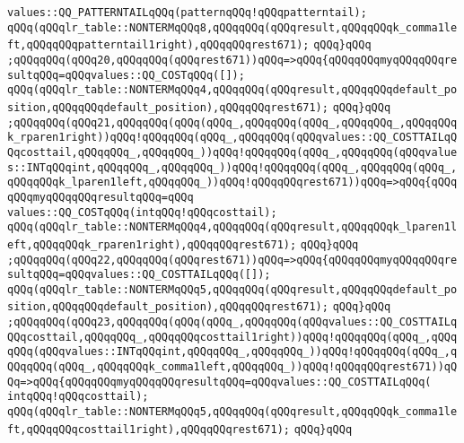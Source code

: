 \verb|values::QQ_PATTERNTAILqQQq(patternqQQq!qQQqpatterntail);|\newline
\verb|qQQq(qQQqlr_table::NONTERMqQQq8,qQQqqQQq(qQQqresult,qQQqqQQqk_comma1left,qQQqqQQqpatterntail1right),qQQqqQQqrest671);|\newline
\verb|qQQq}qQQq|\newline
\verb|;qQQqqQQq(qQQq20,qQQqqQQq(qQQqrest671))qQQq=>qQQq{qQQqqQQqmyqQQqqQQqresultqQQq=qQQqvalues::QQ_COSTqQQq([]);|\newline
\verb|qQQq(qQQqlr_table::NONTERMqQQq4,qQQqqQQq(qQQqresult,qQQqqQQqdefault_position,qQQqqQQqdefault_position),qQQqqQQqrest671);|\newline
\verb|qQQq}qQQq|\newline
\verb|;qQQqqQQq(qQQq21,qQQqqQQq(qQQq(qQQq_,qQQqqQQq(qQQq_,qQQqqQQq_,qQQqqQQqk_rparen1right))qQQq!qQQqqQQq(qQQq_,qQQqqQQq(qQQqvalues::QQ_COSTTAILqQQqcosttail,qQQqqQQq_,qQQqqQQq_))qQQq!qQQqqQQq(qQQq_,qQQqqQQq(qQQqvalues::INTqQQqint,qQQqqQQq_,qQQqqQQq_))qQQq!qQQqqQQq(qQQq_,qQQqqQQq(qQQq_,qQQqqQQqk_lparen1left,qQQqqQQq_))qQQq!qQQqqQQqrest671))qQQq=>qQQq{qQQqqQQqmyqQQqqQQqresultqQQq=qQQq|\newline
\verb|values::QQ_COSTqQQq(intqQQq!qQQqcosttail);|\newline
\verb|qQQq(qQQqlr_table::NONTERMqQQq4,qQQqqQQq(qQQqresult,qQQqqQQqk_lparen1left,qQQqqQQqk_rparen1right),qQQqqQQqrest671);|\newline
\verb|qQQq}qQQq|\newline
\verb|;qQQqqQQq(qQQq22,qQQqqQQq(qQQqrest671))qQQq=>qQQq{qQQqqQQqmyqQQqqQQqresultqQQq=qQQqvalues::QQ_COSTTAILqQQq([]);|\newline
\verb|qQQq(qQQqlr_table::NONTERMqQQq5,qQQqqQQq(qQQqresult,qQQqqQQqdefault_position,qQQqqQQqdefault_position),qQQqqQQqrest671);|\newline
\verb|qQQq}qQQq|\newline
\verb|;qQQqqQQq(qQQq23,qQQqqQQq(qQQq(qQQq_,qQQqqQQq(qQQqvalues::QQ_COSTTAILqQQqcosttail,qQQqqQQq_,qQQqqQQqcosttail1right))qQQq!qQQqqQQq(qQQq_,qQQqqQQq(qQQqvalues::INTqQQqint,qQQqqQQq_,qQQqqQQq_))qQQq!qQQqqQQq(qQQq_,qQQqqQQq(qQQq_,qQQqqQQqk_comma1left,qQQqqQQq_))qQQq!qQQqqQQqrest671))qQQq=>qQQq{qQQqqQQqmyqQQqqQQqresultqQQq=qQQqvalues::QQ_COSTTAILqQQq(|\newline
\verb|intqQQq!qQQqcosttail);|\newline
\verb|qQQq(qQQqlr_table::NONTERMqQQq5,qQQqqQQq(qQQqresult,qQQqqQQqk_comma1left,qQQqqQQqcosttail1right),qQQqqQQqrest671);|\newline
\verb|qQQq}qQQq|\newline
